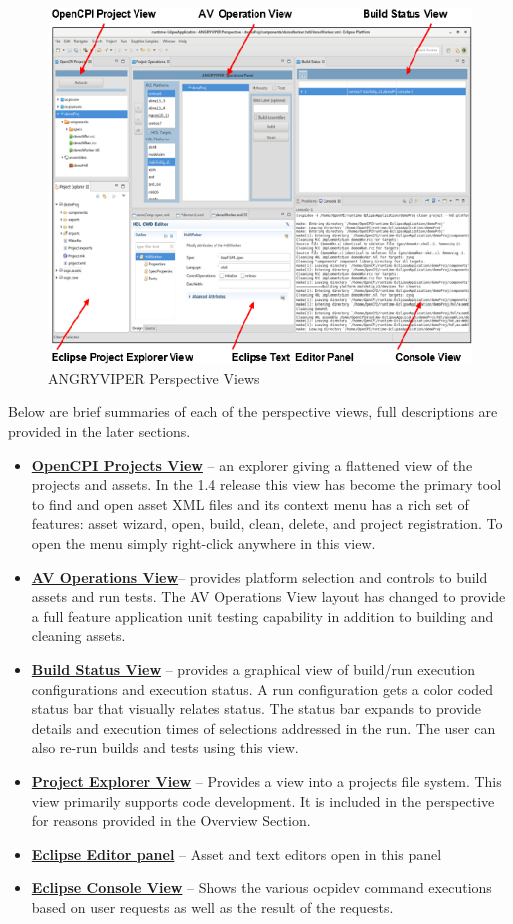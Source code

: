\documentclass[10pt, a4paper, oneside]{article}
\begin{document}
\begin{figure}[h!]
	\centering
	\caption{ANGRYVIPER Perspective Views}\label{fig:AVPerspectiveViews}
	\includegraphics[width=.95\linewidth]{AVPerspectiveViews.png}
\end{figure}

Below are brief summaries of each of the perspective views, full descriptions are provided in the later sections.
\begin{itemize}
\item []	\hyperlink{OpenCPI Projects View Features}{\textbf{OpenCPI Projects View}} – an explorer giving a flattened view of the projects and assets. In the 1.4 release this view has become the primary tool to find and open asset XML files and its context menu has a rich set of features: asset wizard, open, build, clean, delete, and project registration. To open the menu simply right-click anywhere in this view.
\item [] \hyperlink{Operations View }{\textbf{AV Operations View}}– provides platform selection and controls to build assets and run tests. The AV Operations View layout has changed to provide a full feature application unit testing capability in addition to building and cleaning assets.
\item []	\hyperlink{Build Status View Features}{\textbf{Build Status View}} – provides a graphical view of build/run execution configurations and execution status. A run configuration gets a color coded status bar that visually relates status. The status bar expands to provide details and execution times of selections addressed in the run. The user can also re-run builds and tests using this view.
\item [] \hyperlink{Project Explorer View}{\textbf{Project Explorer View}} – Provides a view into a projects file system. This view primarily supports code development. It is included in the perspective for reasons provided in the Overview Section.
\item [] \hyperlink{Editor panel} {\textbf{Eclipse Editor panel}} – Asset and text editors open in this panel
\item [] \hyperlink{Eclipse Console View} {\textbf{Eclipse Console View}} – Shows the various ocpidev command executions based on user requests as well as the result of the requests.
\end{itemize}
\end{document}
